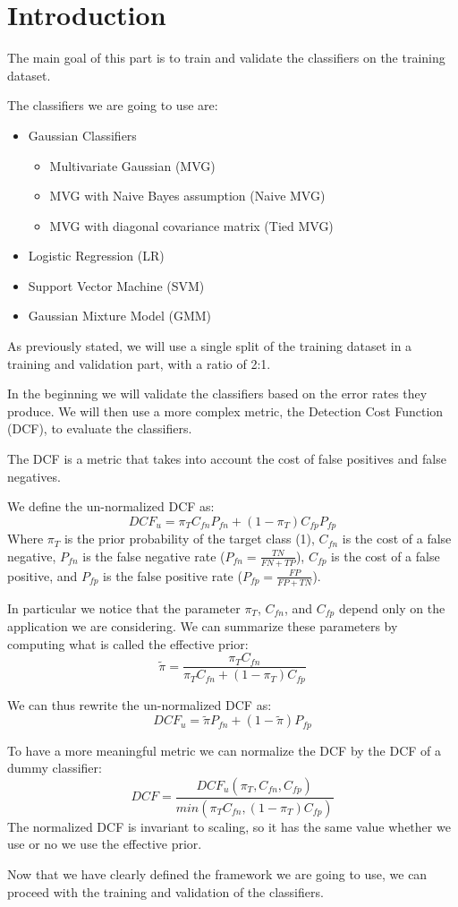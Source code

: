 \documentclass[12pt]{report}
\newcommand{\nnl}{%
    \newline
    \newline
}
\newcommand{\nl}{%
    \newline
    \noindent
}
\begin{document}
\section{Introduction}
The main goal of this part is to train and validate the classifiers on the training dataset.
\nl
The classifiers we are going to use are:
\begin{itemize}
    \item Gaussian Classifiers
          \begin{itemize}
              \item Multivariate Gaussian (MVG)
              \item MVG with Naive Bayes assumption (Naive MVG)
              \item MVG with diagonal covariance matrix (Tied MVG)
          \end{itemize}
    \item Logistic Regression (LR)
    \item Support Vector Machine (SVM)
    \item Gaussian Mixture Model (GMM)
\end{itemize}
\noindent
As previously stated, we will use a single split of the training dataset in a training and validation part, with a ratio of 2:1.
\nl
In the beginning we will validate the classifiers based on the error rates they produce. We will then use a more complex metric, the Detection Cost Function (DCF), to evaluate the classifiers.
\nl
The DCF is a metric that takes into account the cost of false positives and false negatives.
\nl
We define the un-normalized DCF as:
\begin{equation}
    DCF_{u} = \pi_{T}  C_{fn}  P_{fn} + (1-\pi_{T})  C_{fp}  P_{fp}
\end{equation}
Where $\pi_{T}$ is the prior probability of the target class (1), $C_{fn}$ is the cost of a false negative, $P_{fn}$ is the false negative rate ($P_{fn} = \frac{TN}{FN + TP}$), $C_{fp}$ is the cost of a false positive, and $P_{fp}$ is the false positive rate ($P_{fp} = \frac{FP}{FP + TN}$).
\nl
In particular we notice that the parameter $\pi_{T}$, $C_{fn}$, and $C_{fp}$ depend only on the application we are considering. We can summarize these parameters by computing what is called the effective prior:
\begin{equation}
    \tilde{\pi} = \frac{\pi_{T} C_{fn}}{\pi_{T} C_{fn} + (1-\pi_{T}) C_{fp}}
\end{equation}
\nl
We can thus rewrite the un-normalized DCF as:
\begin{equation}
    DCF_{u} = \tilde{\pi} P_{fn} + (1-\tilde{\pi}) P_{fp}
\end{equation}
\nl
To have a more meaningful metric we can normalize the DCF by the DCF of a dummy classifier:
\begin{equation}
    DCF = \frac{DCF_{u}(\pi_T,C_{fn},C_{fp})}{min(\pi_{T}  C_{fn},(1-\pi_{T})  C_{fp})}
\end{equation}
The normalized DCF is invariant to scaling, so it has the same value whether we use or no we use the effective prior.
\nnl
Now that we have clearly defined the framework we are going to use, we can proceed with the training and validation of the classifiers.
\end{document}
